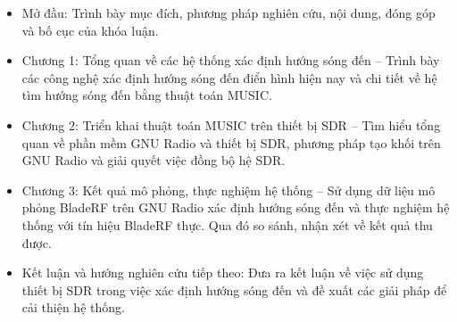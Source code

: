 \renewcommand{\labelitemi}{$-$}
\begin{itemize}
	\item Mở đầu: Trình bày mục đích, phương pháp nghiên cứu, nội dung, đóng góp và bố cục của khóa luận.
	\item Chương 1: Tổng quan về các hệ thống xác định hướng sóng đến – Trình bày các công nghệ xác định hướng sóng đến điển hình hiện nay và chi tiết về hệ tìm hướng sóng đến bằng thuật toán MUSIC.
	\item Chương 2: Triển khai thuật toán MUSIC trên thiết bị SDR – Tìm hiểu tổng quan về phần mềm GNU Radio và thiết bị SDR, phương pháp tạo khối trên GNU Radio và giải quyết việc đồng bộ hệ SDR.
	\item Chương 3: Kết quả mô phỏng, thực nghiệm hệ thống – Sử dụng dữ liệu mô phỏng BladeRF trên GNU Radio xác định hướng sóng đến và thực nghiệm hệ thống với tín hiệu BladeRF thực. Qua đó so sánh, nhận xét về kết quả thu được.
	\item Kết luận và hướng nghiên cứu tiếp theo: Đưa ra kết luận về việc sử dụng thiết bị SDR trong việc xác định hướng sóng đến và đề xuất các giải pháp để cải thiện hệ thống.
\end{itemize} 